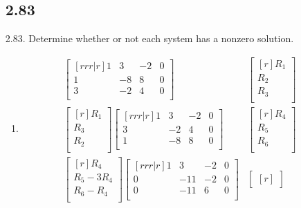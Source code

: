 \documentclass{report}
\begin{document}
\begin{enumerate}
\subsection{2.83}
\item [2.83.] Determine whether or not each system has a nonzero solution.
	\begin{enumerate}
	\item
	\begin{align*}
	\begin{bmatrix}[rrr|r]
	1 & 3 & -2 & 0\\
	1 & -8 & 8 & 0\\
	3 & -2 & 4 & 0\\
	\end{bmatrix}&
	\begin{bmatrix}[r]
	R_1\\ R_2\\ R_3\\
	\end{bmatrix}\\
	\begin{bmatrix}[r]
	R_1\\ R_3\\ R_2\\
	\end{bmatrix}
	\begin{bmatrix}[rrr|r]
	1 & 3 & -2 & 0\\
	3 & -2 & 4 & 0\\
	1 & -8 & 8 & 0\\
	\end{bmatrix}&
	\begin{bmatrix}[r]
	R_4\\ R_5\\ R_6\\
	\end{bmatrix}\\
	\begin{bmatrix}[r]
	R_4\\
	R_5 - 3R_4\\
	R_6 - R_4\\
	\end{bmatrix}
	\begin{bmatrix}[rrr|r]
	1 & 3 & -2 & 0\\
	0 & -11 & -2 & 0\\
	0 & -11 & 6 & 0\\
	\end{bmatrix}&
	\begin{bmatrix}[r]

\end{bmatrix}
\end{align*}
\end{enumerate}
\end{enumerate}
\end{document}
